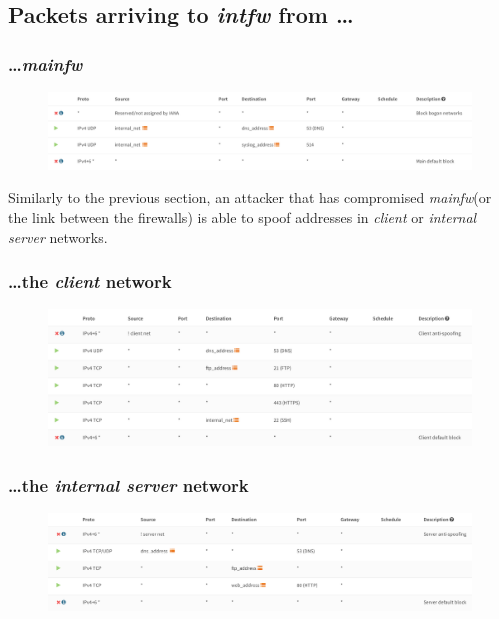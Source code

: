 \documentclass[draft]{homework}
\newcommand{\client}{\textit{client}\xspace}
\newcommand{\ser}{\textit{internal server}\xspace}
\newcommand{\intfw}{\textit{intfw}\xspace}
\newcommand{\mainfw}{\textit{mainfw}\xspace}
\begin{document}
    \subsection{Packets arriving to \intfw from \dots}
    \subsubsection{\dots \mainfw}
    \begin{figure}[H]
        \centering
        \includegraphics[width=\linewidth]{images/intfw-main}
        \label{fig:intfw-main}
    \end{figure}
    Similarly to the previous section, an attacker that has compromised \mainfw (or the link between the firewalls) is able to spoof addresses in \client or \ser networks.
    
    \subsubsection{\dots the \client network}
    \begin{figure}[H]
        \centering
        \includegraphics[width=\linewidth]{images/intfw-client}
        \label{fig:intfw-client}
    \end{figure}
    
    \subsubsection{\dots the \ser network}
    \begin{figure}[H]
        \centering
        \includegraphics[width=\linewidth]{images/intfw-server}
        \label{fig:intfw-server}
    \end{figure}
    
\end{document}

